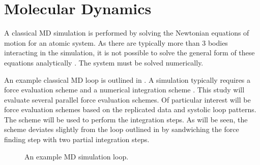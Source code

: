 %
%
\section{Molecular Dynamics}

%
A classical MD simulation is performed by
solving the Newtonian equations of motion for
an atomic system.
%
As there are typically more than 3 bodies interacting in the simulation,
it is not possible to solve the general form of these equations analytically
\cite{vsuvakov2013three}.
%
The system must be solved numerically.

%
An example classical MD loop is outlined in .
%
A simulation typically requires a force evaluation scheme
and a numerical integration scheme
\cite[p.~64]{frenkel2001understanding}.
%
This study will evaluate several parallel force evaluation schemes.
%
Of particular interest will be force evaluation schemes based on
the replicated data and systolic loop patterns.
%
The \velocityverlet{} scheme will be used to perform the integration steps.
%
As will be seen, the \velocityverlet{} scheme deviates slightly from
the loop outlined in  by sandwiching the
force finding step with two partial integration steps.

\begin{figure}
    \begin{center}
    \end{center}
    \caption{An example MD simulation loop.}
    \label{fig:md_loop_flow_chart}
\end{figure}


